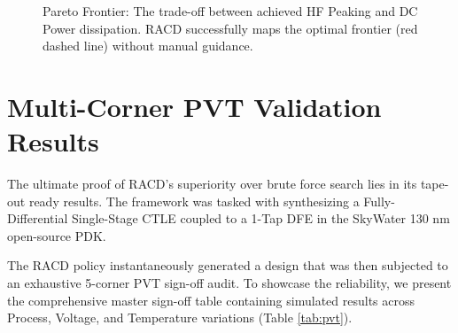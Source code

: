 \documentclass[11pt, a4paper]{article}
\begin{document}
\begin{figure}[!htbp]
    \centering
    \caption{Pareto Frontier: The trade-off between achieved HF Peaking and DC Power dissipation. RACD successfully maps the optimal frontier (red dashed line) without manual guidance.}
\end{figure}

\section{Multi-Corner PVT Validation Results}
The ultimate proof of RACD's superiority over brute force search lies in its tape-out ready results. The framework was tasked with synthesizing a Fully-Differential Single-Stage CTLE coupled to a 1-Tap DFE in the SkyWater 130 nm open-source PDK. 

The RACD policy instantaneously generated a design that was then subjected to an exhaustive 5-corner PVT sign-off audit. To showcase the reliability, we present the comprehensive master sign-off table containing simulated results across Process, Voltage, and Temperature variations (Table \ref{tab:pvt}).
\end{document}
